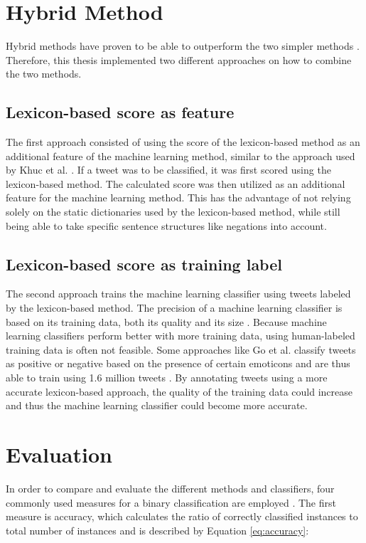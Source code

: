 \section{Hybrid Method}
Hybrid methods have proven to be able to outperform the two simpler methods \cite{khuc}. Therefore, this thesis implemented two different approaches on how to combine the two methods.

\subsection{Lexicon-based score as feature}
The first approach consisted of using the score of the lexicon-based method as an additional feature of the machine learning method, similar to the approach used by Khuc et al. \cite{khuc}. If a tweet was to be classified, it was first scored using the lexicon-based method. The calculated score was then utilized as an additional feature for the machine learning method. This has the advantage of not relying solely on the static dictionaries used by the lexicon-based method, while still being able to take specific sentence structures like negations into account.
\subsection{Lexicon-based score as training label}
The second approach trains the machine learning classifier using tweets labeled by the lexicon-based method. The precision of a machine learning classifier is based on its training data, both its quality and its size \cite{DBLP:journals/csur/GiachanouC16}. Because machine learning classifiers perform better with more training data, using human-labeled training data is often not feasible. Some approaches like Go et al. classify tweets as positive or negative based on the presence of certain emoticons and are thus able to train using 1.6 million tweets \cite{GoBHaHua2009}. By annotating tweets using a more accurate lexicon-based approach, the quality of the training data could increase and thus the machine learning classifier could become more accurate.

\section{Evaluation}
In order to compare and evaluate the different methods and classifiers, four commonly used measures for a binary classification are employed \cite{DBLP:journals/csur/GiachanouC16}. The first measure is accuracy, which calculates the ratio of correctly classified instances to total number of instances and is described by Equation \eqref{eq:accuracy}:

